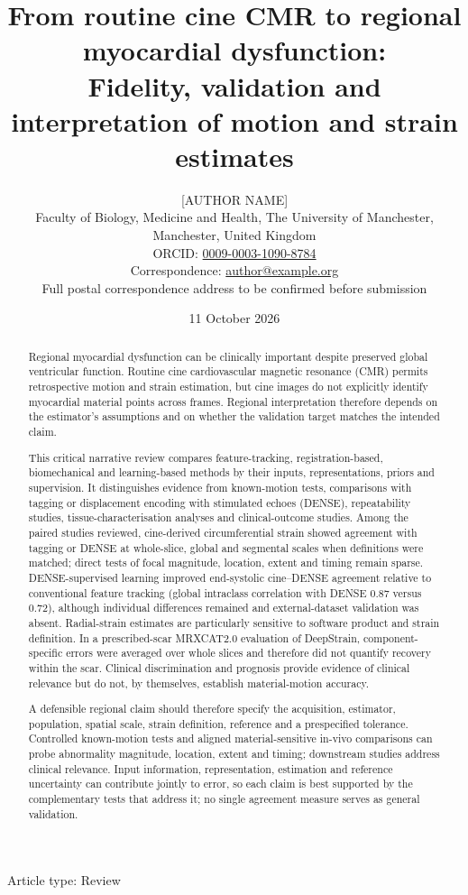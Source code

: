 \documentclass[11pt,a4paper]{article}
\title{\textbf{From routine cine CMR to regional myocardial dysfunction:}\\
\large Fidelity, validation and interpretation of motion and strain estimates}
\author{[AUTHOR NAME]\\[0.25em]
\small Faculty of Biology, Medicine and Health, The University of Manchester, Manchester, United Kingdom\\
\small ORCID: \href{https://orcid.org/0009-0003-1090-8784}{0009-0003-1090-8784}\\
\small Correspondence: \href{mailto:author@example.org}{author@example.org}\\
\small Full postal correspondence address to be confirmed before submission}
\date{11 October 2026}
\begin{document}
\linenumbers
\maketitle
\begin{center}
\small Article type: Review
\end{center}

\begin{abstract}
Regional myocardial dysfunction can be clinically important despite preserved global ventricular function. Routine cine cardiovascular magnetic resonance (CMR) permits retrospective motion and strain estimation, but cine images do not explicitly identify myocardial material points across frames. Regional interpretation therefore depends on the estimator's assumptions and on whether the validation target matches the intended claim.

This critical narrative review compares feature-tracking, registration-based, biomechanical and learning-based methods by their inputs, representations, priors and supervision. It distinguishes evidence from known-motion tests, comparisons with tagging or displacement encoding with stimulated echoes (DENSE), repeatability studies, tissue-characterisation analyses and clinical-outcome studies. Among the paired studies reviewed, cine-derived circumferential strain showed agreement with tagging or DENSE at whole-slice, global and segmental scales when definitions were matched; direct tests of focal magnitude, location, extent and timing remain sparse. DENSE-supervised learning improved end-systolic cine--DENSE agreement relative to conventional feature tracking (global intraclass correlation with DENSE 0.87 versus 0.72), although individual differences remained and external-dataset validation was absent. Radial-strain estimates are particularly sensitive to software product and strain definition. In a prescribed-scar MRXCAT2.0 evaluation of DeepStrain, component-specific errors were averaged over whole slices and therefore did not quantify recovery within the scar. Clinical discrimination and prognosis provide evidence of clinical relevance but do not, by themselves, establish material-motion accuracy.

A defensible regional claim should therefore specify the acquisition, estimator, population, spatial scale, strain definition, reference and a prespecified tolerance. Controlled known-motion tests and aligned material-sensitive in-vivo comparisons can probe abnormality magnitude, location, extent and timing; downstream studies address clinical relevance. Input information, representation, estimation and reference uncertainty can contribute jointly to error, so each claim is best supported by the complementary tests that address it; no single agreement measure serves as general validation.
\end{abstract}
\end{document}

